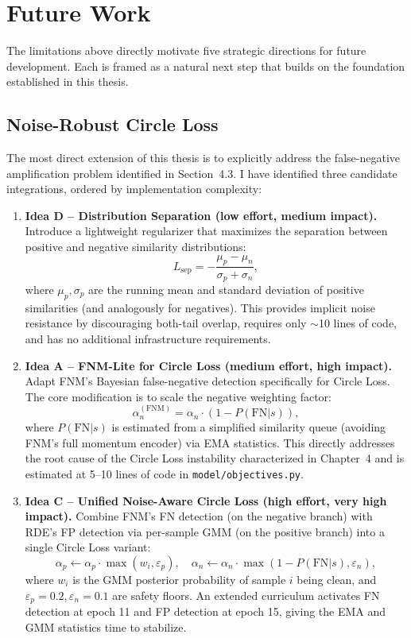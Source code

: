 \documentclass[../main.tex]{subfiles}
\begin{document}
\section{Future Work}

\noindent The limitations above directly motivate five strategic directions for future development. Each is framed as a natural next step that builds on the foundation established in this thesis.

\subsection{Noise-Robust Circle Loss}
\label{sec:fw_noise_robust}

\noindent The most direct extension of this thesis is to explicitly address the false-negative amplification problem identified in Section~4.3. I have identified three candidate integrations, ordered by implementation complexity:

\begin{enumerate}
    \item \textbf{Idea D -- Distribution Separation (low effort, medium impact).} Introduce a lightweight regularizer that maximizes the separation between positive and negative similarity distributions:
    \[
    L_{\text{sep}} = -\frac{\mu_p - \mu_n}{\sigma_p + \sigma_n},
    \]
    where $\mu_p, \sigma_p$ are the running mean and standard deviation of positive similarities (and analogously for negatives). This provides implicit noise resistance by discouraging both-tail overlap, requires only $\sim$10 lines of code, and has no additional infrastructure requirements.

    \item \textbf{Idea A -- FNM-Lite for Circle Loss (medium effort, high impact).} Adapt FNM's Bayesian false-negative detection specifically for Circle Loss. The core modification is to scale the negative weighting factor:
    \[
    \alpha_n^{(\text{FNM})} = \alpha_n \cdot (1 - P(\text{FN} | s)),
    \]
    where $P(\text{FN}|s)$ is estimated from a simplified similarity queue (avoiding FNM's full momentum encoder) via EMA statistics. This directly addresses the root cause of the Circle Loss instability characterized in Chapter~4 and is estimated at 5--10 lines of code in \texttt{model/objectives.py}.

    \item \textbf{Idea C -- Unified Noise-Aware Circle Loss (high effort, very high impact).} Combine FNM's FN detection (on the negative branch) with RDE's FP detection via per-sample GMM (on the positive branch) into a single Circle Loss variant:
    \[
    \alpha_p \leftarrow \alpha_p \cdot \max(w_i, \varepsilon_p), \quad \alpha_n \leftarrow \alpha_n \cdot \max(1 - P(\text{FN}|s), \varepsilon_n),
    \]
    where $w_i$ is the GMM posterior probability of sample $i$ being clean, and $\varepsilon_p{=}0.2, \varepsilon_n{=}0.1$ are safety floors. An extended curriculum activates FN detection at epoch 11 and FP detection at epoch 15, giving the EMA and GMM statistics time to stabilize.
\end{enumerate}
\end{document}
